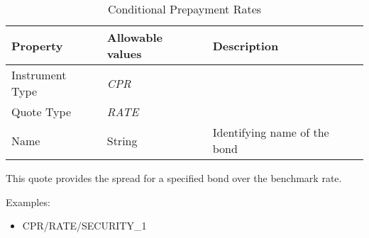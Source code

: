 \begin{table}[H]
\centering
  \begin{tabular}{|p{3cm}|p{3.5cm}|p{7cm}|}
  \hline
  {\bf Property} & {\bf Allowable values} & {\bf Description} \\ \hline
    Instrument Type & \emph{CPR} & \\ \hline
    Quote Type & \emph{RATE} & \\ \hline
    Name & String & Identifying name of the bond \\ \hline
  \end{tabular}
  \caption{Conditional Prepayment Rates}
  \label{tab:cpr_quote}
\end{table}

This quote provides the spread for a specified bond over the benchmark rate.

\medskip
Examples:
\begin{itemize}
	\item CPR/RATE/SECURITY\_1
\end{itemize}



